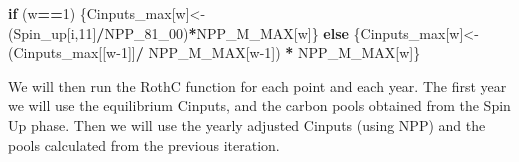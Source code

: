 \documentclass[
  10pt,
  b5paper,
]{book}
\newenvironment{Shaded}{\begin{snugshade}}{\end{snugshade}}
\newcommand{\ControlFlowTok}[1]{\textcolor[rgb]{0.13,0.29,0.53}{\textbf{#1}}}
\newcommand{\DecValTok}[1]{\textcolor[rgb]{0.00,0.00,0.81}{#1}}
\newcommand{\NormalTok}[1]{#1}
\newcommand{\OperatorTok}[1]{\textcolor[rgb]{0.81,0.36,0.00}{\textbf{#1}}}
\newcommand{\StringTok}[1]{\textcolor[rgb]{0.31,0.60,0.02}{#1}}
\begin{document}
\begin{Shaded}
\begin{Highlighting}[]
\ControlFlowTok{if}\NormalTok{ (w}\OperatorTok{==}\DecValTok{1}\NormalTok{) \{Cinputs_max[w]<-(Spin_up[i,}\DecValTok{11}\NormalTok{]}\OperatorTok{/}\NormalTok{NPP_}\DecValTok{81}\NormalTok{_}\DecValTok{00}\NormalTok{)}\OperatorTok{*}\NormalTok{NPP_M_MAX[w]\} }\ControlFlowTok{else}\NormalTok{ \{Cinputs_max[w]<-(Cinputs_max[[w}\DecValTok{-1}\NormalTok{]]}\OperatorTok{/}\StringTok{ }\NormalTok{NPP_M_MAX[w}\DecValTok{-1}\NormalTok{]) }\OperatorTok{*}\StringTok{ }\NormalTok{NPP_M_MAX[w]\} }
\end{Highlighting}
\end{Shaded}

We will then run the RothC function for each point and each year. The first year we will use the equilibrium Cinputs, and the carbon pools obtained from the Spin Up phase. Then we will use the yearly adjusted Cinputs (using NPP) and the pools calculated from the previous iteration.
\end{document}
